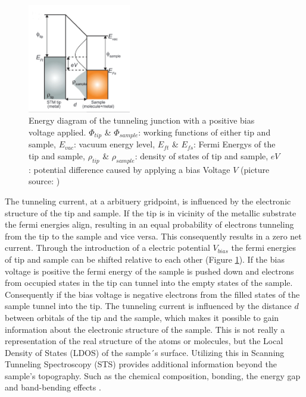 \newpage
\begin{figure}
    \centering
    \includegraphics[width=0.4\textwidth]{graphics/Tunneling_diagram_japan.PNG}
    \caption{Energy diagram of the tunneling junction with a positive bias voltage applied. $\Phi_{tip}$ \& $\Phi_{sample}$: working functions of either tip and sample, $E_{vac}$: vacuum energy level,  $E_{ft}$ \& $E_{fs}$: Fermi Energys of the tip and sample,  $\rho_{tip}$ \& $\rho_{sample}$: density of states of tip and sample,  $eV$: potential difference caused by applying a bias Voltage $V$ (picture source: \cite{Kano}) }
    \label{fig:energy_diagram}
\end{figure}

The tunneling current, at a arbituery gridpoint, is influenced by the electronic structure of the tip and sample.
If the tip is in vicinity of the metallic substrate the fermi energies align, resulting in an equal probability of electrons tunneling from the tip to the sample and vice versa.
This consequently results in a zero net current. 
Through the introduction of a electric potential $V_{bias}$ the fermi energies of tip and sample can be shifted relative to each other (Figure \ref{fig:energy_diagram}).
If the bias voltage is positive the fermi energy of the sample is pushed down and electrons from occupied states in the tip can tunnel into the empty states of the sample.
Consequently if the bias voltage is negative electrons from the filled states of the sample tunnel into the tip.
The tunneling current is influenced by the distance $d$ between orbitals of the tip and the sample, which makes it possible to gain information about the electronic structure of the sample.
This is not really a representation of the real structure of the atoms or molecules, but the Local Density of States (LDOS) of the sample´s surface.
Utilizing this in Scanning Tunneling Spectroscopy (STS) provides additional information beyond the sample's topography.
Such as the chemical composition, bonding, the energy gap and band-bending effects \cite{cbai}.
